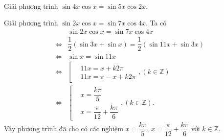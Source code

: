 \begin{bt}%
	Giải phương trình $\sin 4x \cos x =\sin5x \cos2x$.
\end{bt}

\begin{bt}%

	Giải phương trình $\sin 2x\cos x=\sin 7x\cos 4x$.
	\loigiai
	{
		Ta có
		\allowdisplaybreaks
		\begin{eqnarray*}
			&& \sin 2x\cos x=\sin 7x\cos 4x \\
			&\Leftrightarrow & \dfrac{1}{2}\left(\sin 3x + \sin x\right) = \dfrac{1}{2}\left(\sin 11x + \sin 3x\right)\\
			&\Leftrightarrow & \sin x = \sin 11x \\
			&\Leftrightarrow & \left[\begin{aligned}&11x=x+k2\pi	\\&11x=\pi-x+k2\pi\end{aligned}\right. , \left(k\in\mathbb{Z}\right)\\
			&\Leftrightarrow & \left[\begin{aligned}&x=\dfrac{k\pi}{5}	\\&x=\dfrac{\pi}{12}+\dfrac{k\pi}{6}\end{aligned}\right. , \left(k\in\mathbb{Z}\right).
		\end{eqnarray*}
		Vậy phương trình đã cho có các nghiệm $x=\dfrac{k\pi}{5}$, $x=\dfrac{\pi}{12}+\dfrac{k\pi}{6}$ với $k\in\mathbb{Z}$.
	}
\end{bt}

